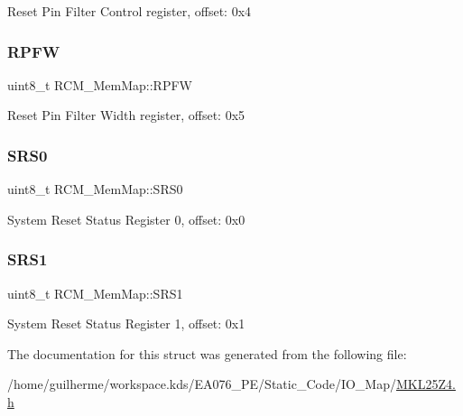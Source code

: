 Reset Pin Filter Control register, offset\+: 0x4 \mbox{\label{struct_r_c_m___mem_map_ac458f95f6aa234285f568694a5b8240d}} 
\subsubsection{\texorpdfstring{R\+P\+FW}{RPFW}}
{\footnotesize\ttfamily uint8\+\_\+t R\+C\+M\+\_\+\+Mem\+Map\+::\+R\+P\+FW}

Reset Pin Filter Width register, offset\+: 0x5 \mbox{\label{struct_r_c_m___mem_map_aa28b91bdb2e1acc454f7bcb9ad26efb7}} 
\subsubsection{\texorpdfstring{S\+R\+S0}{SRS0}}
{\footnotesize\ttfamily uint8\+\_\+t R\+C\+M\+\_\+\+Mem\+Map\+::\+S\+R\+S0}

System Reset Status Register 0, offset\+: 0x0 \mbox{\label{struct_r_c_m___mem_map_a8e7926e6f51e64e63e5ed3adb7aee612}} 
\subsubsection{\texorpdfstring{S\+R\+S1}{SRS1}}
{\footnotesize\ttfamily uint8\+\_\+t R\+C\+M\+\_\+\+Mem\+Map\+::\+S\+R\+S1}

System Reset Status Register 1, offset\+: 0x1 

The documentation for this struct was generated from the following file\+:\begin{DoxyCompactItemize}
\item 
/home/guilherme/workspace.\+kds/\+E\+A076\+\_\+\+P\+E/\+Static\+\_\+\+Code/\+I\+O\+\_\+\+Map/\hyperlink{_m_k_l25_z4_8h}{M\+K\+L25\+Z4.\+h}\end{DoxyCompactItemize}
